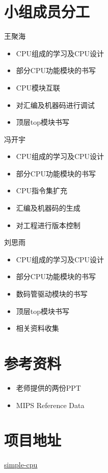\documentclass[UTF8]{article}
\begin{document}
\section{小组成员分工}
王聚海

\begin{itemize}
\item CPU组成的学习及CPU设计
\item 部分CPU功能模块的书写
\item CPU模块互联
\item 对汇编及机器码进行调试
\item 顶层top模块书写
\end{itemize}


冯开宇
\begin{itemize}
    \item CPU组成的学习及CPU设计
    \item 部分CPU功能模块的书写
    \item CPU指令集扩充
\item 汇编及机器码的生成
\item 对工程进行版本控制
\end{itemize}


刘思雨
\begin{itemize}
\item CPU组成的学习及CPU设计
\item 部分CPU功能模块的书写
\item 数码管驱动模块的书写
\item 顶层top模块书写
\item 相关资料收集
\end{itemize}

\section{参考资料}

\begin{itemize}
    \item 老师提供的两份PPT
    \item MIPS Reference Data
\end{itemize}

\section{项目地址}

\href{https://github.com/bit-logic-computer-design-2019/simple-cpu}{simple-cpu}
\end{document}
